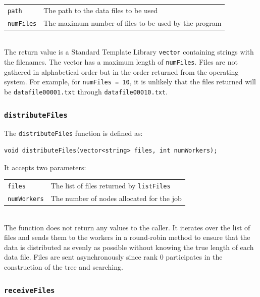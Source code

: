 \documentclass{article}
\begin{document}
\begin{tabular}{l l}
\texttt{path} & The path to the data files to be used \\
\texttt{numFiles} & The maximum number of files to be used by the program \\
\end{tabular}\\

The return value is a Standard Template Library \texttt{vector} containing strings with the filenames. The vector has a maximum length of \texttt{numFiles}. Files are not gathered in alphabetical order but in the order returned from the operating system. For example, for \texttt{numFiles = 10}, it is unlikely that the files returned will be \texttt{datafile00001.txt} through \texttt{datafile00010.txt}.


%
%

\subsubsection{\texttt{distributeFiles}}\label{sec:distributefiles}

The \texttt{distributeFiles} function is defined as:

\lstset{language=C++, keepspaces=true}
\begin{lstlisting}
void distributeFiles(vector<string> files, int numWorkers);
\end{lstlisting}

It accepts two parameters: \\

\begin{tabular}{l l}
\texttt{files} & The list of files returned by \texttt{listFiles} \\
\texttt{numWorkers} & The number of nodes allocated for the job \\
\end{tabular} \\

The function does not return any values to the caller. It iterates over the list of files and sends them to the workers in a round-robin method to ensure that the data is distributed as evenly as possible without knowing the true length of each data file. Files are sent asynchronously since rank 0 participates in the construction of the tree and searching.

%
%

\subsubsection{\texttt{receiveFiles}}\label{sec:receivefiles}
\end{document}
